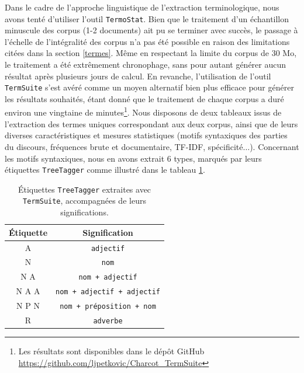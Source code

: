 Dans le cadre de l'approche linguistique de l'extraction terminologique, nous avons tenté d'utiliser l'outil \texttt{TermoStat}. Bien que le traitement d'un échantillon minuscule des corpus (1-2 documents) ait pu se terminer avec succès, le passage à l'échelle de l'intégralité des corpus n'a pas été possible en raison des limitations citées dans la section \ref{termes}. Même en respectant la limite du corpus de 30 Mo, le traitement a été extrêmement chronophage, sans pour autant générer aucun résultat après plusieurs jours de calcul. En revanche, l'utilisation de l'outil \texttt{TermSuite} s'est avéré comme un moyen alternatif bien plus efficace pour générer les résultats souhaités, étant donné que le traitement de chaque corpus a duré environ une vingtaine de minutes\footnote{Les résultats sont disponibles dans le dépôt GitHub \url{https://github.com/ljpetkovic/Charcot\_TermSuite}}. Nous disposons de deux tableaux issus de l'extraction des termes uniques correspondant aux deux corpus, ainsi que de leurs diverses caractéristiques et mesures statistiques (motifs syntaxiques des parties du discours, fréquences brute et documentaire, \textsc{TF-IDF}, spécificité$\dots$). Concernant les motifs syntaxiques, nous en avons extrait 6 types, marqués par leurs étiquettes \texttt{TreeTagger} comme illustré dans le tableau \ref{tab:POS_tags}. 
\begin{table}[h]
	\centering
	\begin{tabular}{c|c}
		Étiquette & Signification \\\hline
		\textsc{A} & \texttt{adjectif}\\
		\textsc{N} & \texttt{nom}\\ 
		\textsc{N A} & \texttt{nom + adjectif}\\
		\textsc{N A A} & \texttt{nom + adjectif + adjectif}\\
		\textsc{N P N} & \texttt{nom + préposition + nom}\\
		\textsc{R} & \texttt{adverbe}
	\end{tabular}
	\caption{Étiquettes \texttt{TreeTagger} extraites avec \texttt{TermSuite}, accompagnées de leurs significations.}
	\label{tab:POS_tags}
\end{table} 

